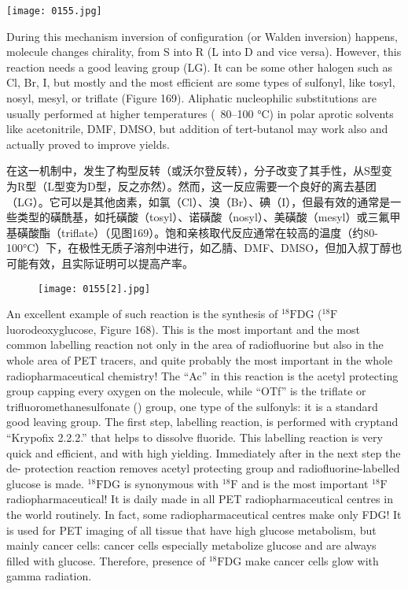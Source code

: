 \documentclass[dvipsnames, svgnames,a4paper,11pt]{article}
\begin{document}
\begin{figure*}[h]
	\centering
    \texttt{[image: 0155.jpg]}    
\end{figure*}

During this mechanism inversion of configuration (or Walden inversion) happens,
molecule changes chirality, from S into R (L into D and vice versa). However, this
reaction needs a good leaving group (LG). It can be some other halogen such as Cl,
Br, I, but mostly and the most efficient are some types of sulfonyl, like tosyl, nosyl,
mesyl, or triflate (Figure 169). Aliphatic nucleophilic substitutions are usually
performed at higher temperatures (~80–100 °C) in polar aprotic solvents like
acetonitrile, DMF, DMSO, but addition of tert-butanol may work also and actually
proved to improve yields.

在这一机制中，发生了构型反转（或沃尔登反转），分子改变了其手性，从S型变为R型（L型变为D型，反之亦然）。然而，这一反应需要一个良好的离去基团（LG）。它可以是其他卤素，如氯（Cl）、溴（Br）、碘（I），但最有效的通常是一些类型的磺酰基，如托磺酸（tosyl）、诺磺酸（nosyl）、美磺酸（mesyl）或三氟甲基磺酸酯（triflate）（见图169）。饱和亲核取代反应通常在较高的温度（约80-100°C）下，在极性无质子溶剂中进行，如乙腈、DMF、DMSO，但加入叔丁醇也可能有效，且实际证明可以提高产率。

\begin{figure}[h]
	\centering
    \texttt{[image: 0155[2].jpg]}    
     \label{fig169}
\end{figure}


An excellent example of such reaction is the synthesis of ${}^\mathrm{18}\mathrm{F}$DG
(${}^\mathrm{18}\mathrm{F}$luorodeoxyglucose, Figure 168). This is the most important and the most
common labelling reaction not only in the area of radiofluorine but also in the whole
area of PET tracers, and quite probably the most important in the whole
radiopharmaceutical chemistry! The “Ac” in this reaction is the acetyl protecting
group capping every oxygen on the molecule, while “OTf” is the triflate or
trifluoromethanesulfonate () group, one type of the sulfonyls: it is a standard
good leaving group. The first step, labelling reaction, is performed with cryptand
“Krypofix 2.2.2.” that helps to dissolve fluoride. This labelling reaction is very quick
and efficient, and with high yielding. Immediately after in the next step the de-
protection reaction removes acetyl protecting group and radiofluorine-labelled
glucose is made. ${}^\mathrm{18}\mathrm{F}$DG is synonymous with ${}^\mathrm{18}\mathrm{F}$ and is the most important ${}^\mathrm{18}\mathrm{F}$
radiopharmaceutical! It is daily made in all PET radiopharmaceutical centres in the
world routinely. In fact, some radiopharmaceutical centres make only FDG! It is used
for PET imaging of all tissue that have high glucose metabolism, but mainly cancer
cells: cancer cells especially metabolize glucose and are always filled with glucose.
Therefore, presence of ${}^\mathrm{18}\mathrm{F}$DG make cancer cells glow with gamma radiation.
\end{document}

